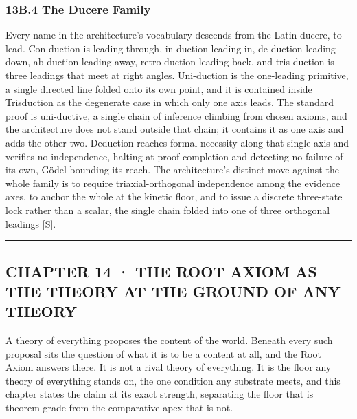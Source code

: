 \documentclass[10pt,twocolumn]{article}
\begin{document}
\hypertarget{b.4-the-ducere-family}{%
\subsubsection{13B.4 The Ducere Family}\label{b.4-the-ducere-family}}

Every name in the architecture's vocabulary descends from the Latin
ducere, to lead. Con-duction is leading through, in-duction leading in,
de-duction leading down, ab-duction leading away, retro-duction leading
back, and tris-duction is three leadings that meet at right angles.
Uni-duction is the one-leading primitive, a single directed line folded
onto its own point, and it is contained inside Trisduction as the
degenerate case in which only one axis leads. The standard proof is
uni-ductive, a single chain of inference climbing from chosen axioms,
and the architecture does not stand outside that chain; it contains it
as one axis and adds the other two. Deduction reaches formal necessity
along that single axis and verifies no independence, halting at proof
completion and detecting no failure of its own, Gödel bounding its
reach. The architecture's distinct move against the whole family is to
require triaxial-orthogonal independence among the evidence axes, to
anchor the whole at the kinetic floor, and to issue a discrete
three-state lock rather than a scalar, the single chain folded into one
of three orthogonal leadings {[}S{]}.

\begin{center}\rule{0.5\linewidth}{0.5pt}\end{center}

\hypertarget{chapter-14-the-root-axiom-as-the-theory-at-the-ground-of-any-theory}{%
\subsection{CHAPTER 14 · THE ROOT AXIOM AS THE THEORY AT THE GROUND OF
ANY
THEORY}\label{chapter-14-the-root-axiom-as-the-theory-at-the-ground-of-any-theory}}

A theory of everything proposes the content of the world. Beneath every
such proposal sits the question of what it is to be a content at all,
and the Root Axiom answers there. It is not a rival theory of
everything. It is the floor any theory of everything stands on, the one
condition any substrate meets, and this chapter states the claim at its
exact strength, separating the floor that is theorem-grade from the
comparative apex that is not.
\end{document}
